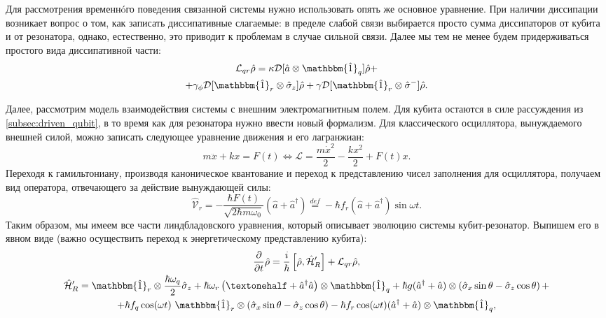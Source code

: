 \documentclass[12pt, twoside]{report}
\numberwithin{equation}{section}
\numberwithin{figure}{section}
\begin{document}
Для рассмотрения временнóго поведения связанной системы нужно использовать опять же основное уравнение. При наличии диссипации возникает вопрос о том, как записать диссипативные слагаемые: в пределе слабой связи выбирается просто сумма диссипаторов от кубита и от резонатора, однако, естественно, это приводит к проблемам в случае сильной связи\cite{beaudoin2011}. Далее мы тем не менее будем придерживаться простого вида диссипативной части:
\begin{gather*}
\mathcal{L}_{qr} \hat \rho = \kappa \mathcal{D}[\hat a \otimes \mathbbm{\hat 1}_q]\hat\rho + \\ +\gamma_\phi \mathcal{D}[\mathbbm{\hat 1}_r \otimes \hat \sigma_z]\hat\rho + \gamma\mathcal{D}[\mathbbm{\hat 1}_r \otimes \hat \sigma^-]\hat\rho .
\end{gather*}

Далее, рассмотрим модель взаимодействия системы с внешним электромагнитным полем. Для кубита остаются в силе рассуждения из \autoref{subsec:driven_qubit}, в то время как для резонатора нужно ввести новый формализм.	Для классического осциллятора, вынуждаемого внешней силой, можно записать следующее уравнение движения и его лагранжиан: 
$$m \ddot{x} + k x = F(t) \Leftrightarrow \mathcal{L} = \frac{m \dot{x}^{2}}{2}-\frac{kx^2}{2} + F(t) x .$$
Переходя к гамильтониану, производя каноническое квантование и переход к представлению чисел заполнения для осциллятора, получаем вид оператора, отвечающего за действие вынуждающей силы:
\[
\mathcal{\hat V}_r = -\frac{\hbar F(t)}{\sqrt{2\hbar m \omega_0}} (\hat a + \hat a^{\dag}) \overset{def}{=} - \hbar f_r (\hat a + \hat a^{\dag}) \sin \omega t.
\label{eq:osc_driving_term}
\]
Таким образом, мы имеем все части линдбладовского уравнения, который описывает эволюцию системы кубит-резонатор. Выпишем его в явном виде (важно осуществить переход к энергетическому представлению кубита\cite{ithier2005}):
\begin{gather}
\frac{\partial}{\partial t} \hat \rho= \frac{i}{\hbar}\left[\hat \rho, \mathcal{\hat H}_R^\prime \right] + \mathcal{L}_{qr}\hat \rho, 
\label{eq:master_equation}
\\
\mathcal{\hat H}_R^\prime = \mathbbm{\hat 1}_r \otimes \frac{\hbar \omega_q}{2} \hat \sigma_z  + \hbar \omega_r \left(½ +\hat a^\dag \hat a \right)\otimes \mathbbm{\hat 1}_q + \hbar g (\hat a^\dag + \hat a) \otimes \left( \hat \sigma_x \sin\theta-  \hat\sigma_z \cos\theta \right) + \notag
\\ 
+\hbar f_q \cos(\omega t)~ \mathbbm{\hat 1}_r \otimes \left( \hat \sigma_x \sin\theta -  \hat\sigma_z \cos\theta \right) - \hbar f_r \cos(\omega t) (\hat a^\dag + \hat a)\otimes \mathbbm{\hat 1}_q ,  \notag
\end{gather}
\end{document}
